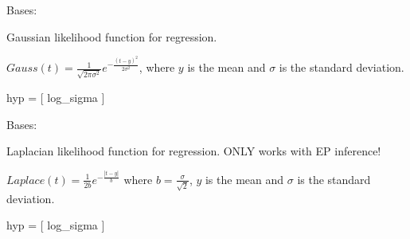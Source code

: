 \documentclass[letterpaper,10pt,english]{sphinxmanual}
\begin{document}
\begin{fulllineitems}
\label{pyGPs.Core:pyGPs.Core.lik.Gauss}
Bases: {\hyperref[pyGPs.Core:pyGPs.Core.lik.Likelihood]{}}

Gaussian likelihood function for regression.

$Gauss(t)=\frac{1}{\sqrt{2\pi\sigma^2}}e^{-\frac{(t-y)^2}{2\sigma^2}}$,
where $y$ is the mean and $\sigma$ is the standard deviation.

hyp = {[} log\_sigma {]}

\begin{fulllineitems}
\label{pyGPs.Core:pyGPs.Core.lik.Gauss.proceed}
\end{fulllineitems}


\end{fulllineitems}


\begin{fulllineitems}
\label{pyGPs.Core:pyGPs.Core.lik.Laplace}
Bases: {\hyperref[pyGPs.Core:pyGPs.Core.lik.Likelihood]{}}

Laplacian likelihood function for regression. ONLY works with EP inference!

$Laplace(t) = \frac{1}{2b}e^{-\frac{|t-y|}{b}}$ where $b=\frac{\sigma}{\sqrt{2}}$,
$y$ is the mean and $\sigma$ is the standard deviation.

hyp = {[} log\_sigma {]}

\begin{fulllineitems}
\label{pyGPs.Core:pyGPs.Core.lik.Laplace.proceed}
\end{fulllineitems}


\end{fulllineitems}

\end{document}
